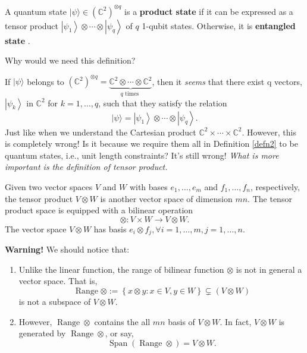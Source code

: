 \begin{definition}\label{defn2}
  A quantum state $|\psi\rangle \in\left(\mathbb{C}^2\right)^{\otimes q}$ is a \textbf{product state} if it can be expressed as a tensor product $\left|\psi_1\right\rangle \otimes \cdots \otimes\left|\psi_q\right\rangle$ of $q$ 1-qubit states. Otherwise, it is \textbf{entangled state }.
\end{definition}

Why would we need this definition?

If $|\psi\rangle$ belongs to $\left(\mathbb{C}^2\right)^{\otimes q}=\underbrace{\mathbb{C}^2 \otimes \cdots \otimes \mathbb{C}^2}_{q \text { times }}$, then it \textit{seems} that there exist q vectors, $\left|\psi_k\right\rangle$ in $\mathbb{C}^2$ for $k=1,\dots,q$, such that they satisfy the relation $$|\psi\rangle=\left|\psi_1\right\rangle \otimes \cdots \otimes\left|\psi_q\right\rangle.$$ Just like when we understand the Cartesian product $\mathbb{C}^2 \times \cdots \times \mathbb{C}^2$. However, this is completely wrong!
Is it because we require them all in Definition \ref{defn2} to be quantum states, i.e., unit length constraints? It's still wrong! \textit{What is more important is the definition of tensor product.}


\begin{remark}
    Given two vector spaces $V$ and $W$ with bases $e_1, \ldots, e_m$ and $f_1, \ldots, f_n$, respectively, the tensor product $V \otimes W$ is another vector space of dimension $m n$. The tensor product space is equipped with a bilinear operation $$\otimes: V \times W \rightarrow V \otimes W.$$ The vector space $V \otimes W$ has basis $e_i \otimes f_j, \forall i=1, \ldots, m, j=1, \ldots, n$.
    
    \textbf{Warning!} We should notice that:
    \begin{enumerate}
        \item Unlike the linear function, the range of bilinear function $\otimes$ is not in general a vector space. That is,
            \begin{equation*}
                \operatorname{Range} \otimes:= \left\{x \otimes y :x \in V, y \in W \right\} \subsetneq (V \otimes W)
            \end{equation*} 
            is not a subspace of $V \otimes W$.
        \item However, $\operatorname{Range} \otimes$ contains the all $mn$ basis of $V \otimes W$. In fact, $V \otimes W$ is generated by $\operatorname{Range} \otimes$, or say, $$\operatorname{Span}(\operatorname{Range} \otimes)=V \otimes W.$$
    \end{enumerate}
\end{remark}

